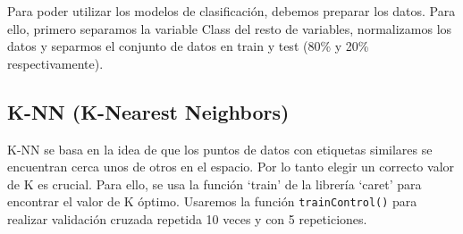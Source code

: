\documentclass[
]{article}
\newenvironment{Shaded}{\begin{snugshade}}{\end{snugshade}}
\newcommand{\AttributeTok}[1]{\textcolor[rgb]{0.13,0.29,0.53}{#1}}
\newcommand{\ConstantTok}[1]{\textcolor[rgb]{0.56,0.35,0.01}{#1}}
\newcommand{\DecValTok}[1]{\textcolor[rgb]{0.00,0.00,0.81}{#1}}
\newcommand{\FloatTok}[1]{\textcolor[rgb]{0.00,0.00,0.81}{#1}}
\newcommand{\FunctionTok}[1]{\textcolor[rgb]{0.13,0.29,0.53}{\textbf{#1}}}
\newcommand{\NormalTok}[1]{#1}
\newcommand{\OtherTok}[1]{\textcolor[rgb]{0.56,0.35,0.01}{#1}}
\newcommand{\SpecialCharTok}[1]{\textcolor[rgb]{0.81,0.36,0.00}{\textbf{#1}}}
\newcommand{\StringTok}[1]{\textcolor[rgb]{0.31,0.60,0.02}{#1}}
\begin{document}
Para poder utilizar los modelos de clasificación, debemos preparar los
datos. Para ello, primero separamos la variable Class del resto de
variables, normalizamos los datos y separmos el conjunto de datos en
train y test (80\% y 20\% respectivamente).

\begin{Shaded}
\end{Shaded}

\hypertarget{k-nn-k-nearest-neighbors}{%
\subsection{K-NN (K-Nearest Neighbors)}\label{k-nn-k-nearest-neighbors}}

K-NN se basa en la idea de que los puntos de datos con etiquetas
similares se encuentran cerca unos de otros en el espacio. Por lo tanto
elegir un correcto valor de K es crucial. Para ello, se usa la función
`train' de la librería `caret' para encontrar el valor de K óptimo.
Usaremos la función \texttt{trainControl()} para realizar validación
cruzada repetida 10 veces y con 5 repeticiones.
\end{document}
